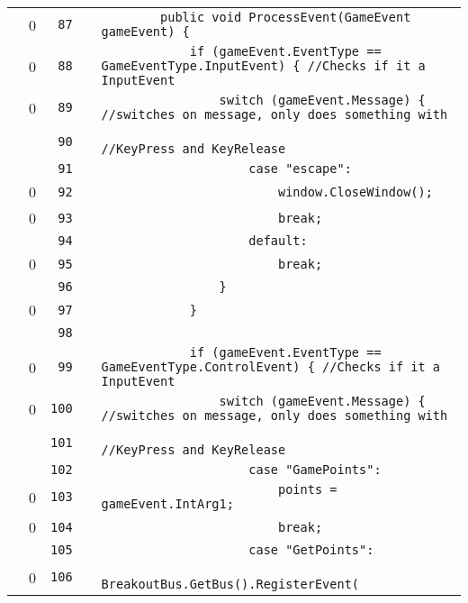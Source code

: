 \documentclass[a4paper,landscape,10pt]{article}
\begin{document}
\begin{longtable}[l]{lrrll}
\cellcolor{red} & 0 & \verb~87~ & & \verb~        public void ProcessEvent(GameEvent gameEvent) {~\\
\cellcolor{red} & 0 & \verb~88~ & & \verb~            if (gameEvent.EventType == GameEventType.InputEvent) { //Checks if it a InputEvent~\\
\cellcolor{red} & 0 & \verb~89~ & & \verb~                switch (gameEvent.Message) { //switches on message, only does something with~\\
\cellcolor{gray} &  & \verb~90~ & & \verb~                                             //KeyPress and KeyRelease~\\
\cellcolor{gray} &  & \verb~91~ & & \verb~                    case "escape":~\\
\cellcolor{red} & 0 & \verb~92~ & & \verb~                        window.CloseWindow();~\\
\cellcolor{red} & 0 & \verb~93~ & & \verb~                        break;~\\
\cellcolor{gray} &  & \verb~94~ & & \verb~                    default:~\\
\cellcolor{red} & 0 & \verb~95~ & & \verb~                        break;~\\
\cellcolor{gray} &  & \verb~96~ & & \verb~                }~\\
\cellcolor{red} & 0 & \verb~97~ & & \verb~            }~\\
\cellcolor{gray} &  & \verb~98~ & & \verb~~\\
\cellcolor{red} & 0 & \verb~99~ & & \verb~            if (gameEvent.EventType == GameEventType.ControlEvent) { //Checks if it a InputEvent~\\
\cellcolor{red} & 0 & \verb~100~ & & \verb~                switch (gameEvent.Message) { //switches on message, only does something with~\\
\cellcolor{gray} &  & \verb~101~ & & \verb~                                             //KeyPress and KeyRelease~\\
\cellcolor{gray} &  & \verb~102~ & & \verb~                    case "GamePoints":~\\
\cellcolor{red} & 0 & \verb~103~ & & \verb~                        points = gameEvent.IntArg1;~\\
\cellcolor{red} & 0 & \verb~104~ & & \verb~                        break;~\\
\cellcolor{gray} &  & \verb~105~ & & \verb~                    case "GetPoints":~\\
\cellcolor{red} & 0 & \verb~106~ & & \verb~                        BreakoutBus.GetBus().RegisterEvent(~\\

\end{longtable}
\end{document}
